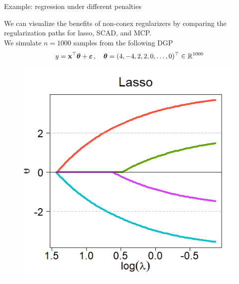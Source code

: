 \documentclass[11pt,compress,t,notes=noshow, xcolor=table]{beamer}
\begin{document}
\begin{vbframe}{Example: regression under different penalties}

We can visualize the benefits of non-conex regularizers by comparing the regularization paths for lasso, SCAD, and MCP.\\
\vspace{0.15cm}
We simulate $n=1000$ samples from the following DGP
{\small
$$y = \mathbf{x}^{\top} \bm{\theta} + \bm{\varepsilon}\,,\quad \bm{\theta} =(4,-4,2,2,0,\ldots,0)^{\top} \in \mathbb{R}^{1000}$$
}
\vspace{-1cm}

  \begin{figure}[h]
    \begin{minipage}{0.32\linewidth}
      \vspace{3pt}
      \centerline{\includegraphics[width=\textwidth]{figure/other-pen-lasso.png}}
    \end{minipage}
    \begin{minipage}{0.32\linewidth}
      \vspace{3pt}

\end{minipage}
\end{figure}
\end{vbframe}
\end{document}
